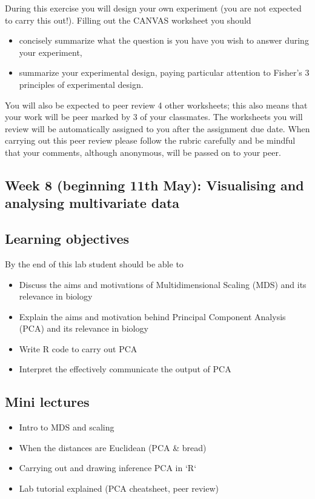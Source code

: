 \documentclass{article}
\begin{document}
During this exercise you will design your own experiment (you are not expected to carry this out!). Filling out the CANVAS worksheet you should 

\begin{itemize}
\item concisely summarize what the question is you have you wish to answer during your experiment,

\item summarize your experimental design, paying particular attention to Fisher's 3 principles of experimental design.
\end{itemize}

You will also be expected to peer review 4 other worksheets; this also means that your work will be peer marked by 3 of your classmates. The worksheets you will review will be automatically assigned to you after the assignment due date. When carrying out this peer review please follow the rubric carefully and be mindful that your comments, although anonymous, will be passed on to your peer.


\newpage

\subsection*{Week 8 (beginning 11th May): Visualising and analysing multivariate data}
\subsection*{Learning objectives}
By the end of this lab student should be able to
\begin{itemize}
\item Discuss the aims and motivations of Multidimensional Scaling (MDS) and its relevance in biology
   \item Explain the aims and motivation behind Principal Component Analysis (PCA) and its relevance in biology
   \item Write R code to carry out PCA
   \item Interpret the effectively communicate the output of PCA
\end{itemize}

\subsection*{Mini lectures}

\begin{itemize}
\item Intro to MDS and scaling
\item When the distances are Euclidean (PCA \& bread)
\item Carrying out and drawing inference PCA in `R`
\item Lab tutorial explained (PCA cheatsheet, peer review)
\end{itemize}
\end{document}

